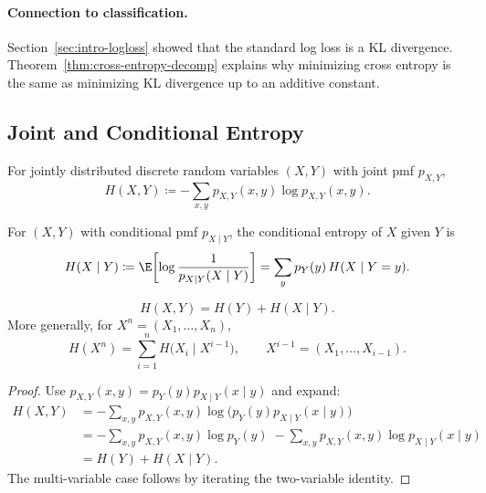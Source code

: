 \paragraph{Connection to classification.}
Section~\ref{sec:intro-logloss} showed that the standard log loss is a KL divergence.
Theorem~\ref{thm:cross-entropy-decomp} explains why minimizing cross entropy is the same as minimizing KL divergence up to an additive constant.

\subsection{Joint and Conditional Entropy}
\label{sec:entropy-conditional}

\begin{definition}
For jointly distributed discrete random variables $(X,Y)$ with joint pmf $p_{X,Y}$,
\begin{equation}
    H(X,Y)\coloneqq -\sum_{x,y} p_{X,Y}(x,y)\log p_{X,Y}(x,y).
\end{equation}
\end{definition}

\begin{definition}
For $(X,Y)$ with conditional pmf $p_{X\mid Y}$, the conditional entropy of $X$ given $Y$ is
\begin{equation}
    H(X\mid Y)
    \coloneqq \E\!\left[\log\frac{1}{p_{X\mid Y}(X\mid Y)}\right]
    = \sum_{y} p_Y(y)\,H(X\mid Y=y).
\end{equation}
\end{definition}

\begin{theorem}
\label{thm:entropy-chain-rule}
\begin{equation}
    H(X,Y) = H(Y) + H(X\mid Y).
\end{equation}
More generally, for $X^n=(X_1,\dots,X_n)$,
\begin{equation}
    H(X^n)=\sum_{i=1}^n H\bigl(X_i\mid X^{i-1}\bigr),\qquad X^{i-1}=(X_1,\dots,X_{i-1}).
\end{equation}
\end{theorem}
\begin{proof}
Use $p_{X,Y}(x,y)=p_Y(y)p_{X\mid Y}(x\mid y)$ and expand:
\[
\begin{aligned}
H(X,Y)
&=-\sum_{x,y}p_{X,Y}(x,y)\log\bigl(p_Y(y)p_{X\mid Y}(x\mid y)\bigr)\\
&=-\sum_{x,y}p_{X,Y}(x,y)\log p_Y(y)\; -\sum_{x,y}p_{X,Y}(x,y)\log p_{X\mid Y}(x\mid y)\\
&=H(Y)+H(X\mid Y).
\end{aligned}
\]
The multi-variable case follows by iterating the two-variable identity.
\end{proof}


